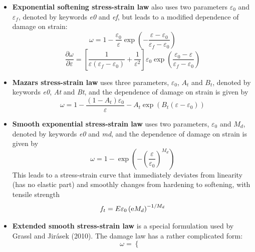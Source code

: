 \documentclass[a4paper]{article}
\begin{document}
\begin{itemize}
{\bf Linear softening stress-strain law} works directly with strain
and does not make any adjustment for the element size. The specified
parameters $\varepsilon_0$ and $\varepsilon_f$, denoted by keywords {\it e0}
and {\it ef}, have the meaning of (equivalent) strain at peak stress and at
complete failure. The linear relation between stress and strain on the
softening branch is obtained with the damage law
$$
\omega =\frac{\varepsilon_f}{\varepsilon_f-\varepsilon_0}\left(1-\frac{\varepsilon_0}{\varepsilon}\right)
$$
Again, to cover general conditions, $\varepsilon$ is replaced by $\kappa$.
$$
\frac{\partial\omega}{\partial\varepsilon} = \frac{\varepsilon_0 \varepsilon_f}{\varepsilon^2 ( \varepsilon_f - \varepsilon_0 )}
$$
\item
{\bf Exponential softening stress-strain law} also uses two parameters
 $\varepsilon_0$ and $\varepsilon_f$, denoted by keywords {\it e0}
and {\it ef}, but leads to a modified dependence of damage on strain:
$$
\omega =1-\frac{\varepsilon_0}{\varepsilon}\exp\left(-\frac{\varepsilon-\varepsilon_0}{\varepsilon_f-\varepsilon_0}\right)
$$
$$
\frac{\partial\omega}{\partial\varepsilon} = \left[ \frac{1}{\varepsilon(\varepsilon_f-\varepsilon_0)} + \frac{1}{\varepsilon^2} \right] \varepsilon_0 \exp \left (\frac{\varepsilon_0-\varepsilon}{\varepsilon_f-\varepsilon_0} \right )
$$
\item
{\bf Mazars stress-strain law} uses three parameters, $\varepsilon_0$,
$A_t$ and $B_t$, denoted by keywords {\it e0}, {\it At} and {\it Bt}, and the
dependence of damage on strain is given by
$$
\omega =1-\frac{(1-A_t)\varepsilon_0}{\varepsilon}-A_t\exp\left(B_t(\varepsilon-\varepsilon_0)\right)
$$
\item
{\bf Smooth exponential stress-strain law} uses two parameters, $\varepsilon_0$
and $M_d$, denoted by keywords {\it e0} and {\it md}, and the
dependence of damage on strain is given by
$$
\omega = 1-\exp\left(-\left(\frac{\varepsilon}{\varepsilon_0}\right)^{M_d}\right)
$$
This leads to a stress-strain curve that immediately deviates from linearity
(has no elastic part) and smoothly changes from hardening to softening,
with tensile strength
$$
f_t = E\varepsilon_0\left({\rm e}M_d\right)^{-1/M_d}
$$
\item
{\bf Extended smooth stress-strain law} is a special formulation used
by Grassl and Jir\'{a}sek (2010). The damage law has a rather complicated form:
\begin{equation} \label{eq:damageEvol}
\omega = \left \{ \begin{array}{ll} 

\end{array}
\end{equation}
\end{itemize}
\end{document}
